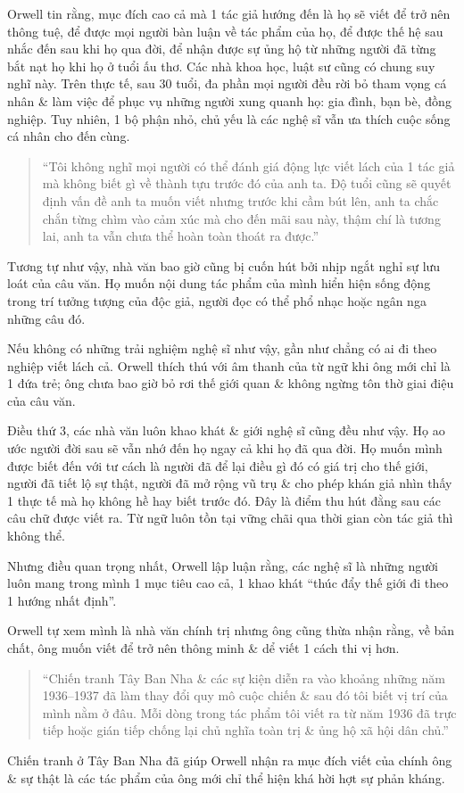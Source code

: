 \documentclass[oneside]{book}
\numberwithin{equation}{section}
\begin{document}
Orwell tin rằng, mục đích cao cả mà 1 tác giả hướng đến là họ sẽ viết để trở nên thông tuệ, để được mọi người bàn luận về tác phẩm của họ, để được thế hệ sau nhắc đến sau khi họ qua đời, để nhận được sự ủng hộ từ những người đã từng bắt nạt họ khi họ ở tuổi ấu thơ. Các nhà khoa học, luật sư cũng có chung suy nghĩ này. Trên thực tế, sau 30 tuổi, đa phần mọi người đều rời bỏ tham vọng cá nhân \& làm việc để phục vụ những người xung quanh họ: gia đình, bạn bè, đồng nghiệp. Tuy nhiên, 1 bộ phận nhỏ, chủ yếu là các nghệ sĩ vẫn ưa thích cuộc sống cá nhân cho đến cùng.

\begin{quotation}
	``Tôi không nghĩ mọi người có thể đánh giá động lực viết lách của 1 tác giả mà không biết gì về thành tựu trước đó của anh ta. Độ tuổi cũng sẽ quyết định vấn đề anh ta muốn viết nhưng trước khi cầm bút lên, anh ta chắc chắn từng chìm vào cảm xúc mà cho đến mãi sau này, thậm chí là tương lai, anh ta vẫn chưa thể hoàn toàn thoát ra được.''
\end{quotation}
Tương tự như vậy, nhà văn bao giờ cũng bị cuốn hút bởi nhịp ngắt nghỉ sự lưu loát của câu văn. Họ muốn nội dung tác phẩm của mình hiển hiện sống động trong trí tưởng tượng của độc giả, người đọc có thể phổ nhạc hoặc ngân nga những câu đó.

Nếu không có những trải nghiệm nghệ sĩ như vậy, gần như chẳng có ai đi theo nghiệp viết lách cả. Orwell thích thú với âm thanh của từ ngữ khi ông mới chỉ là 1 đứa trẻ; ông chưa bao giờ bỏ rơi thế giới quan \& không ngừng tôn thờ giai điệu của câu văn.

Điều thứ 3, các nhà văn luôn khao khát \& giới nghệ sĩ cũng đều như vậy. Họ ao ước người đời sau sẽ vẫn nhớ đến họ ngay cả khi họ đã qua đời. Họ muốn mình được biết đến với tư cách là người đã để lại điều gì đó có giá trị cho thế giới, người đã tiết lộ sự thật, người đã mở rộng vũ trụ \& cho phép khán giả nhìn thấy 1 thực tế mà họ không hề hay biết trước đó. Đây là điểm thu hút đằng sau các câu chữ được viết ra. Từ ngữ luôn tồn tại vững chãi qua thời gian còn tác giả thì không thể.

Nhưng điều quan trọng nhất, Orwell lập luận rằng, các nghệ sĩ là những người luôn mang trong mình 1 mục tiêu cao cả, 1 khao khát ``thúc đẩy thế giới đi theo 1 hướng nhất định''.

Orwell tự xem mình là nhà văn chính trị nhưng ông cũng thừa nhận rằng, về bản chất, ông muốn viết để trở nên thông minh \& dể viết 1 cách thi vị hơn.

\begin{quotation}
	``Chiến tranh Tây Ban Nha \& các sự kiện diễn ra vào khoảng những năm 1936--1937 đã làm thay đổi quy mô cuộc chiến \& sau đó tôi biết vị trí của mình nằm ở đâu. Mỗi dòng trong tác phẩm tôi viết ra từ năm 1936 đã trực tiếp hoặc gián tiếp chống lại chủ nghĩa toàn trị \& ủng hộ xã hội dân chủ.''
\end{quotation}
Chiến tranh ở Tây Ban Nha đã giúp Orwell nhận ra mục đích viết của chính ông \& sự thật là các tác phẩm của ông mới chỉ thể hiện khá hời hợt sự phản kháng.
\end{document}
